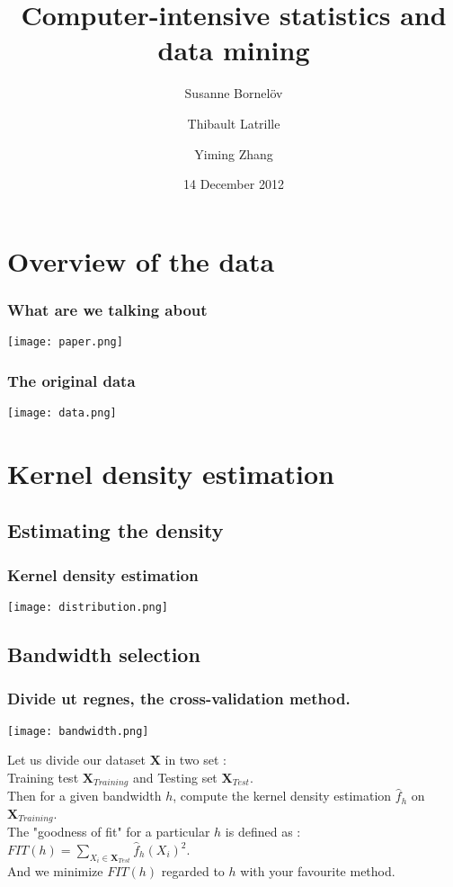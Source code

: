 \documentclass[10pt]{beamer}
\author{Susanne Bornelöv \and Thibault Latrille \and Yiming Zhang}
\title{Computer-intensive statistics and data mining}
\institute{Uppsala Universitet, Mathematics department}
\date{14 December 2012}
\begin{document}
\frame{\titlepage} 

\section{Overview of the data}

\begin{frame}
\frametitle{What are we talking about}
	\begin{center}
       \texttt{[image: paper.png]}
	\end{center}
\end{frame}

\begin{frame}
\frametitle{The original data}
	\begin{center}
       \texttt{[image: data.png]}
	\end{center}
\end{frame}

\section{Kernel density estimation}
\subsection{Estimating the density}

\begin{frame}
\frametitle{Kernel density estimation}
	\begin{center}
       \texttt{[image: distribution.png]}
	\end{center}
\end{frame}

\subsection{Bandwidth selection}

\begin{frame}
\frametitle{\textbf{Divide ut regnes,} the cross-validation method.}
	\begin{center}
       \texttt{[image: bandwidth.png]}\\
            \begin{scriptsize}
  Let us divide our dataset $\pmb{X}$ in two set : \\
  Training test $\pmb{X}_{Training}$ and Testing set $\pmb{X}_{Test}$. \\ Then for a given bandwidth $h$, compute the kernel density estimation $\widehat{f}_h$ on $\pmb{X}_{Training}$. \\The "goodness of fit" for a particular $h$ is defined as : 
       $ FIT(h)=\sum_{X_i \in \pmb{X}_{Test}}  \widehat{f}_h(X_i)^2 $.\\
       And we minimize $FIT(h)$ regarded to $h$ with your favourite method. 
\end{scriptsize}
     \end{center}
\end{frame}
\end{document}
